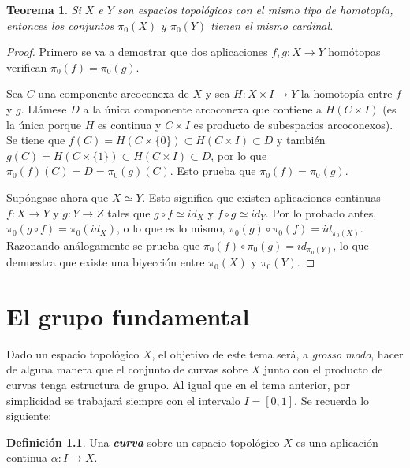 \documentclass[11pt]{report}
\newenvironment{ctheorem} %
  {\begin{mdframed}[innertopmargin = 0pt,
                    innerbottommargin = 7.5pt,
                    backgroundcolor = lightgray!10,
                    linewidth = 1pt,
                    shadow = true,
                    shadowsize = 5pt,
                    roundcorner = 0pt,
                    skipabove = 0pt]
    \begin{theorem}}
  {\end{theorem}\end{mdframed}}
\newtheorem{theorem}{Teorema}[chapter]
\theoremstyle{definition}
\newtheorem{definition}{Definición}[chapter]
\theoremstyle{definition}
\theoremstyle{remark}
\begin{document}
\hfill

\begin{ctheorem}
    Si $X$ e $Y$ son espacios topológicos con el mismo tipo de homotopía, entonces los conjuntos $\pi_0(X)$ y $\pi_0(Y)$ tienen el mismo cardinal.
\end{ctheorem}

\begin{proof}
Primero se va a demostrar que dos aplicaciones $f,g \colon X \to Y$ homótopas verifican $\pi_0(f) = \pi_0(g)$. 

\vspace{2mm}

Sea $C$ una componente arcoconexa de $X$ y sea $H \colon X \times I \to Y$ la homotopía entre $f$ y $g$. Llámese $D$ a la única componente arcoconexa que contiene a $H(C \times I)$ (es la única porque $H$ es continua y $C \times I$ es producto de subespacios arcoconexos). Se tiene que $f(C) = H(C \times \{0\}) \subset H(C \times I) \subset D$ y también $g(C) = H(C \times \{1\}) \subset H(C \times I) \subset D$, por lo que $\pi_0(f)(C) = D = \pi_0(g)(C)$. Esto prueba que $\pi_0(f) = \pi_0(g)$.

\vspace{2mm}

Supóngase ahora que $X \simeq Y$. Esto significa que existen aplicaciones continuas $f \colon X \to Y$ y $g \colon Y \to Z$ tales que $g \circ f \simeq id_X$ y $f \circ g \simeq id_Y$. Por lo probado antes, $\pi_0(g \circ f) = \pi_0(id_X)$, o lo que es lo mismo, $\pi_0(g) \circ \pi_0(f) = id_{\pi_0(X)}$. Razonando análogamente se prueba que $\pi_0(f) \circ \pi_0(g) = id_{\pi_0(Y)}$, lo que demuestra que existe una biyección entre $\pi_0(X)$ y $\pi_0(Y)$.
\end{proof}

\chapter{El grupo fundamental}

Dado un espacio topológico $X$, el objetivo de este tema será, a \textit{grosso modo}, hacer de alguna manera que el conjunto de curvas sobre $X$ junto con el producto de curvas tenga estructura de grupo. Al igual que en el tema anterior, por simplicidad se trabajará siempre con el intervalo $I = [0,1]$. Se recuerda lo siguiente:

\begin{definition}
Una \textbf{\textit{curva}} sobre un espacio topológico $X$ es una aplicación continua $\alpha \colon I \to X$.
\end{definition}
\end{document}
